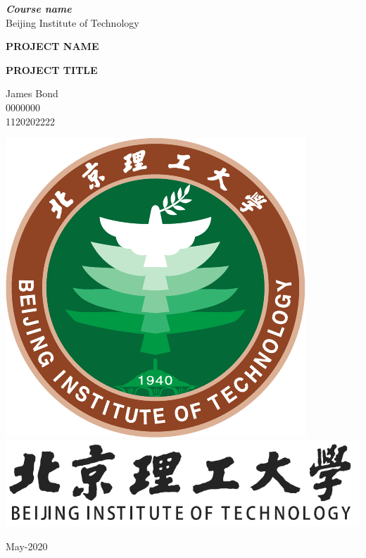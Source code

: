 \documentclass[11pt,english, openany]{book}
\begin{document}

\begin{titlepage}
	\clearpage\thispagestyle{empty}
	\centering
	\vspace{1cm}

	{\normalsize \textbf{\textit{Course name}} \\ 
		Beijing Institute of Technology \par}
		\vspace{5.5cm}
	{\Huge \textbf{PROJECT NAME}} \\
	\vspace{0.6cm}
	{\large \textbf{PROJECT TITLE} \par}
	\vspace{4.3cm}
	{\normalsize James Bond \\ %
	             0000000 \\
	             1120202222\par}
	\vspace{2.6cm}
    
    \centering \includegraphics[scale=0.6]{bit_logo.pdf}\\
    \centering \includegraphics[scale=0.4]{logo_slogan.pdf}
    \vspace{0.5cm}

		
	{\normalsize May-2020 \par}
	
	\pagebreak

\end{titlepage}
\end{document}
